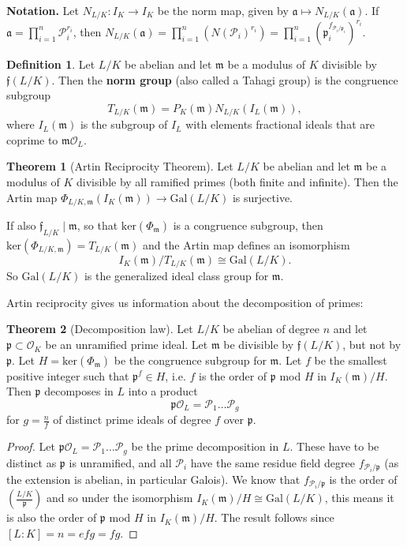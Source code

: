 \documentclass{article}
\theoremstyle{definition}
\newtheorem{theorem}{Theorem}[section]
\newtheorem{defn}{Definition}[section]
\begin{document}
\textbf{Notation.} Let $N_{L/K}: I_K \to I_K$ be the norm map, given by $\mathfrak{a} \mapsto N_{L/K}(\mathfrak{a})$. If $\mathfrak{a} =\prod_{i=1}^{n} \mathcal{P}_i^{r_i}$, then $N_{L/K}(\mathfrak{a}) = \prod_{i=1}^{n} (N(\mathcal{P}_i)^{r_i}) = \prod_{i=1}^{n} (\mathfrak{p}_i^{f_{\mathcal{P}_i/\mathfrak{p}_i}})^{r_i}$.
\begin{defn}
    Let $L/K$ be abelian and let $\mathfrak{m}$ be a modulus of $K$ divisible by $\mathfrak{f}(L/K)$. Then the \textbf{norm group} (also called a Tahagi group) is the congruence subgroup
    \[
    T_{L/K}(\mathfrak{m}) = P_K(\mathfrak{m})N_{L/K}(I_L(\mathfrak{m})),
    \]
    where $I_L(\mathfrak{m})$ is the subgroup of $I_L$ with elements fractional ideals that are coprime to $\mathfrak{m}\mathcal{O}_L$.
\end{defn}
\begin{theorem}[Artin Reciprocity Theorem]
    Let $L/K$ be abelian and let $\mathfrak{m}$ be a modulus of $K$ divisible by all ramified primes (both finite and infinite). Then the Artin map $\Phi_{L/K,\mathfrak{m}}(I_K(\mathfrak{m})) \to \text{Gal}(L/K)$ is surjective.
    \vspace{1mm}
     
    If also $\mathfrak{f}_{L/K} \mid \mathfrak{m}$, so that $\text{ker}(\Phi_{\mathfrak{m}})$ is a congruence subgroup, then $\text{ker}(\Phi_{L/K,\mathfrak{m}}) = T_{L/K}(\mathfrak{m})$ and the Artin map defines an isomorphism \[
    I_K(\mathfrak{m})/T_{L/K}(\mathfrak{m}) \cong \text{Gal}(L/K).
    \]
    So $\text{Gal}(L/K)$ is the generalized ideal class group for $\mathfrak{m}$. 
\end{theorem}
Artin reciprocity gives us information about the decomposition of primes:
\begin{theorem}[Decomposition law]
    Let $L/K$ be abelian of degree $n$ and let $\mathfrak{p} \subset \mathcal{O}_K$ be an unramified prime ideal. Let $\mathfrak{m}$ be divisible by $\mathfrak{f}(L/K)$, but not by $\mathfrak{p}$. Let $H = \text{ker}(\Phi_{\mathfrak{m}})$ be the congruence subgroup for $\mathfrak{m}$. Let $f$ be the smallest positive integer such that $\mathfrak{p}^{f} \in H$, i.e. $f$ is the order of $\mathfrak{p}$ mod $H$ in $I_K(\mathfrak{m})/H$. Then $\mathfrak{p}$ decomposes in $L$ into a product $$\mathfrak{p}\mathcal{O}_L = \mathcal{P}_1 \ldots \mathcal{P}_g$$ for $g = \frac{n}{f}$ of distinct prime ideals of degree $f$ over $\mathfrak{p}$.
\end{theorem}
\begin{proof}
    Let $\mathfrak{p}\mathcal{O}_L = \mathcal{P}_1\ldots\mathcal{P}_g$ be the prime decomposition in $L$. These have to be distinct as $\mathfrak{p}$ is unramified, and all $\mathcal{P}_i$ have the same residue field degree $f_{\mathcal{P}_i/\mathfrak{p}}$ (as the extension is abelian, in particular Galois). We know that $f_{\mathcal{P}_i/\mathfrak{p}}$ is the order of $\left(\frac{L/K}{\mathfrak{p}}\right)$ and so under the isomorphism $I_K(\mathfrak{m})/H \cong \text{Gal}(L/K)$, this means it is also the order of $\mathfrak{p}$ mod $H$ in $I_K(\mathfrak{m})/H$. The result follows since $[L:K] = n = efg = fg$.
\end{proof}
\end{document}
